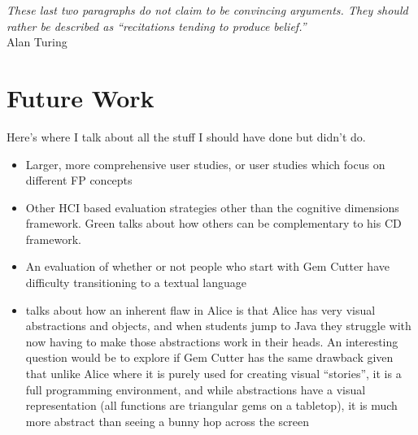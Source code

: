 \label{concl}

\begin{flushright}
\textit{These last two paragraphs do not claim to be convincing arguments. They should rather be described as ``recitations tending to produce belief.''}
\\
Alan Turing \cite{Turing50} \\
\end{flushright}


\section{Future Work}

Here's where I talk about all the stuff I should have done but didn't do. 

\begin{itemize}
\item Larger, more comprehensive user studies, or user studies which focus on different FP concepts
\item Other HCI based evaluation strategies other than the cognitive dimensions framework.  Green talks about how others can be complementary to his CD framework.
\item An evaluation of whether or not people who start with Gem Cutter have difficulty transitioning to a textual language
\item \cite{brown08} talks about how an inherent flaw in Alice is that Alice has very visual abstractions and objects, and 
when students jump to Java they struggle with now having to make those abstractions work in their heads.  An interesting question
would be to explore if Gem Cutter has the same drawback given that unlike Alice where it is purely used for creating visual
``stories'', it is a full programming environment, and while abstractions have a visual representation (all functions are 
triangular gems on a tabletop), it is much more abstract than seeing a bunny hop across the screen
\end{itemize} 